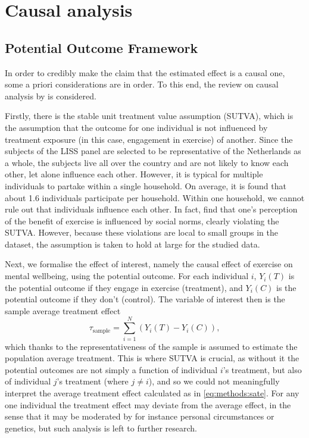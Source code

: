 \section{Causal analysis}
\label{sec:methods:causal}

\subsection{Potential Outcome Framework}
In order to credibly make the claim that the estimated effect is a causal one, some a priori considerations are in order.
To this end, the review on causal analysis by  is considered.

Firstly, there is the stable unit treatment value assumption (SUTVA), which is the assumption that the outcome for one
individual is not influenced by treatment exposure (in this case, engagement in exercise) of another.
Since the subjects of the LISS panel are selected to be representative of the Netherlands as a whole, the subjects
live all over the country and are not likely to know each other, let alone influence each other. However, it is typical
for multiple individuals to partake within a single household. On average, it is found that about 1.6 individuals participate
per household. Within one household, we cannot rule out that individuals influence each other. In fact, 
find that one's perception of the benefit of exercise is influenced by social norms, clearly violating the SUTVA.
However, because these violations are local to small groups in the dataset, the assumption is taken to hold at large for
the studied data.

Next, we formalise the effect of interest, namely the causal effect of exercise on mental wellbeing, using the
potential outcome.
For each individual $i$, $Y_i(T)$ is the potential outcome if they engage in exercise (treatment),
and $Y_i(C)$ is the potential outcome if they don't (control). The variable of interest then is the sample average
treatment effect
\begin{equation}
\label{eq:methods:sate}
    \tau_{\text{sample}} = \sum_{i=1}^N (Y_i(T) - Y_i(C)),
\end{equation}
which thanks to the representativeness of the sample is assumed to estimate the population average treatment.
This is where SUTVA is crucial, as without it the potential outcomes are not simply a function of individual $i$'s treatment,
but also of individual $j$'s treatment (where $j \neq i$), and so we could not meaningfully interpret the average
treatment effect calculated as in \cref{eq:methods:sate}.
For any one individual the treatment effect may deviate from the average effect, in the sense that it may be moderated by
for instance personal circumstances or genetics, but such analysis is left to further research.

